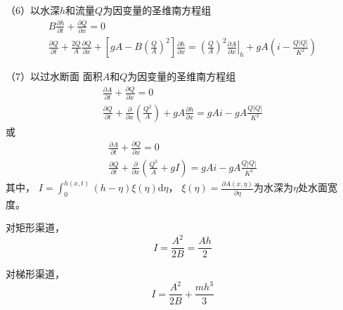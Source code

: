 （6）以水深$h$和流量$Q$为因变量的圣维南方程组
\begin{equation}
  \begin{gathered}
    B\frac{\partial h}{\partial t}
    +
    \frac{\partial Q}{\partial x}
    =
    0
    \\
    \frac{\partial Q}{\partial t}
    +
    \frac{2Q}{A}\frac{\partial Q}{\partial x}
    +
    \left[
      gA -
      B
      \left(
      \frac{Q}{A}
      \right)^{2}
    \right]
    \frac{\partial h}{\partial x}
    =
    \left(
    \frac{Q}{A}
    \right)^{2}
    \left.
    \frac{\partial A}{\partial x}
    \right|_{h}
    +
    gA\left(
      i
    -
    \frac{Q|Q|}{K^{2}}
    \right)
  \end{gathered}
  \label{EqCGe_SV_hQ}
\end{equation}


（7）以过水断面
面积$A$和$Q$为因变量的圣维南方程组
\begin{equation}
  \begin{gathered}
    \frac{\partial A}{\partial t}
    +
    \frac{\partial Q}{\partial x}
    =
    0
    \\
    \frac{\partial Q}{\partial t}
    +
    \frac{\partial}{\partial x}\left(\frac{Q^{2}}{A}\right)
 + gA\frac{\partial h}{\partial x}    =
    gAi
    -
    gA\frac{Q|Q|}{K^{2}}
  \end{gathered}
  \label{EqCGe_SV_AQ_2}
\end{equation}
或
\begin{equation}
  \begin{gathered}
    \frac{\partial A}{\partial t}
    +
    \frac{\partial Q}{\partial x}
    =
    0
    \\
    \frac{\partial Q}{\partial t}
    +
    \frac{\partial}{\partial x}\left(\frac{Q^{2}}{A}+gI\right)
    =
    gAi
    -gA\frac{Q|Q|}{K^{2}}
  \end{gathered}
  \label{EqCGe_SV_AQ_1}
\end{equation}
其中， $I = \int_{0}^{h(x,t)}(h-\eta)\xi(\eta) \mathrm{d}\eta$，
$\xi(\eta) =\frac{\partial A(x, \eta )}{\partial \eta}$为水深为$\eta$处水面宽
度。

对矩形渠道，
\begin{equation}
  I = \frac{A^{2 }}{2B} = \frac{Ah}{2}
\end{equation}

对梯形渠道，
\begin{equation}
  I = \frac{A^{2 }}{2B} + \frac{mh^{3}}{3}
\end{equation}

